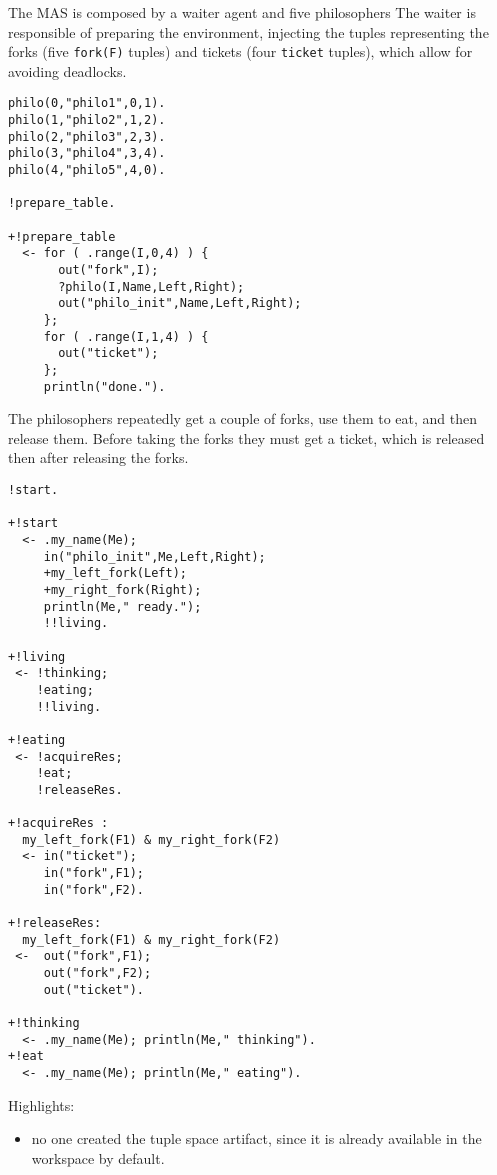 \documentclass[11pt]{report}
\newcommand\code[1]{{\small{\mbox{\texttt{{#1}}}}}}
\begin{document}
%
\noindent The MAS is composed by a waiter agent and five philosophers
%
The waiter is responsible of preparing the environment, injecting the tuples representing the forks (five \code{fork(F)} tuples) and tickets (four \code{ticket} tuples), which allow for avoiding deadlocks.

{\small{\begin{verbatim}
philo(0,"philo1",0,1).
philo(1,"philo2",1,2).
philo(2,"philo3",2,3).
philo(3,"philo4",3,4).
philo(4,"philo5",4,0).

!prepare_table.

+!prepare_table
  <- for ( .range(I,0,4) ) {
       out("fork",I);
       ?philo(I,Name,Left,Right);
       out("philo_init",Name,Left,Right);
     };
     for ( .range(I,1,4) ) {
       out("ticket");
     };
     println("done.").
\end{verbatim}}}

%
\noindent The philosophers repeatedly get a couple of forks, use them to eat, and then release them.
%
Before taking the forks they must get a ticket, which is released then after releasing the forks.
{\small{\begin{verbatim}
!start.

+!start
  <- .my_name(Me);
     in("philo_init",Me,Left,Right);
     +my_left_fork(Left);
     +my_right_fork(Right);
     println(Me," ready.");
     !!living.
     
+!living
 <- !thinking;
    !eating;
    !!living.

+!eating 
 <- !acquireRes;
    !eat;
    !releaseRes.
      
+!acquireRes : 
  my_left_fork(F1) & my_right_fork(F2) 
  <- in("ticket");
     in("fork",F1);
     in("fork",F2).
  
+!releaseRes: 
  my_left_fork(F1) & my_right_fork(F2) 
 <-  out("fork",F1);
     out("fork",F2);
     out("ticket").
       
+!thinking 
  <- .my_name(Me); println(Me," thinking").
+!eat 
  <- .my_name(Me); println(Me," eating").
\end{verbatim}}}
%

\noindent Highlights:

\begin{itemize}
%
\item no one created the tuple space artifact, since it is already available in the workspace by default.
%
\end{itemize} 

\end{document}
